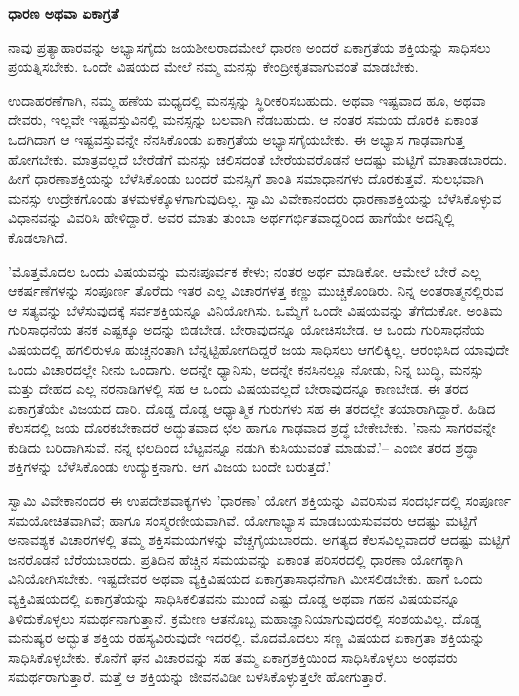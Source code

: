 \textbf{ಧಾರಣ ಅಥವಾ ಏಕಾಗ್ರತೆ}

ನಾವು ಪ್ರತ್ಯಾಹಾರವನ್ನು ಅಭ್ಯಾಸಗೈದು ಜಯಶೀಲರಾದಮೇಲೆ ಧಾರಣ ಅಂದರೆ ಏಕಾಗ್ರತೆಯ ಶಕ್ತಿಯನ್ನು ಸಾಧಿಸಲು ಪ್ರಯತ್ನಿಸಬೇಕು. ಒಂದೇ ವಿಷಯದ ಮೇಲೆ ನಮ್ಮ ಮನಸ್ಸು ಕೇಂದ್ರೀಕೃತವಾಗುವಂತೆ ಮಾಡಬೇಕು.

ಉದಾಹರಣೆಗಾಗಿ, ನಮ್ಮ ಹಣೆಯ ಮಧ್ಯದಲ್ಲಿ ಮನಸ್ಸನ್ನು ಸ್ಥಿರೀಕರಿಸಬಹುದು. ಅಥವಾ ಇಷ್ಟವಾದ ಹೂ, ಅಥವಾ ದೇವರು, ಇಲ್ಲವೇ ಇಷ್ಟವಸ್ತುವಿನಲ್ಲಿ ಮನಸ್ಸನ್ನು ಬಲವಾಗಿ ನೆಡಬಹುದು. ಆ ನಂತರ ಸಮಯ ದೊರಕಿ ಏಕಾಂತ ಒದಗಿದಾಗ ಆ ಇಷ್ಟವಸ್ತುವನ್ನೇ ನೆನಸಿಕೊಂಡು ಏಕಾಗ್ರತೆಯ ಅಭ್ಯಾಸಗೈಯಬೇಕು. ಈ ಅಭ್ಯಾಸ ಗಾಢವಾಗುತ್ತ ಹೋಗಬೇಕು. ಮಾತ್ರವಲ್ಲದೆ ಬೇರೆಡೆಗೆ ಮನಸ್ಸು ಚಲಿಸದಂತೆ ಬೇರೆಯವರೊಡನೆ ಆದಷ್ಟು ಮಟ್ಟಿಗೆ ಮಾತಾಡಬಾರದು. ಹೀಗೆ ಧಾರಣಾಶಕ್ತಿಯನ್ನು ಬೆಳೆಸಿಕೊಂಡು ಬಂದರೆ ಮನಸ್ಸಿಗೆ ಶಾಂತಿ ಸಮಾಧಾನಗಳು ದೊರಕುತ್ತವೆ. ಸುಲಭವಾಗಿ ಮನಸ್ಸು ಉದ್ರೇಕಗೊಂಡು ತಳಮಳಕ್ಕೊಳಗಾಗುವುದಿಲ್ಲ. ಸ್ವಾಮಿ ವಿವೇಕಾನಂದರು ಧಾರಣಾಶಕ್ತಿಯನ್ನು ಬೆಳೆಸಿಕೊಳ್ಳುವ ವಿಧಾನವನ್ನು ವಿವರಿಸಿ ಹೇಳಿದ್ದಾರೆ. ಅವರ ಮಾತು ತುಂಬಾ ಅರ್ಥಗರ್ಭಿತವಾದ್ದರಿಂದ ಹಾಗೆಯೇ ಅದನ್ನಿಲ್ಲಿ ಕೊಡಲಾಗಿದೆ.

'ಮೊತ್ತಮೊದಲ ಒಂದು ವಿಷಯವನ್ನು ಮನಃಪೂರ್ವಕ ಕೇಳು; ನಂತರ ಅರ್ಥ ಮಾಡಿಕೋ. ಆಮೇಲೆ ಬೇರೆ ಎಲ್ಲ ಆಕರ್ಷಣೆಗಳನ್ನು ಸಂಪೂರ್ಣ ತೊರೆದು ಇತರ ಎಲ್ಲ ವಿಚಾರಗಳತ್ತ ಕಣ್ಣು ಮುಚ್ಚಿಕೊಂಡಿರು. ನಿನ್ನ ಅಂತರಾತ್ಮನಲ್ಲಿರುವ ಆ ಸತ್ಯವನ್ನು ಬೆಳೆಸುವುದಕ್ಕೆ ಸರ್ವಶಕ್ತಿಯನ್ನೂ ವಿನಿಯೋಗಿಸು. ಒಮ್ಮೆಗೆ ಒಂದೇ ವಿಷಯವನ್ನು ತೆಗೆದುಕೋ. ಅಂತಿಮ ಗುರಿಸಾಧನೆಯ ತನಕ ಎಷ್ಟಕ್ಕೂ ಅದನ್ನು ಬಿಡಬೇಡ. ಬೇರಾವುದನ್ನೂ ಯೋಚಿಸಬೇಡ. ಆ ಒಂದು ಗುರಿಸಾಧನೆಯ ವಿಷಯದಲ್ಲಿ ಹಗಲಿರುಳೂ ಹುಚ್ಚನಂತಾಗಿ ಬೆನ್ನಟ್ಟಿಹೋಗದಿದ್ದರೆ ಜಯ ಸಾಧಿಸಲು ಆಗಲಿಕ್ಕಿಲ್ಲ. ಆರಂಭಿಸಿದ ಯಾವುದೇ ಒಂದು ವಿಚಾರದಲ್ಲೇ ನೀನು ಒಂದಾಗು. ಅದನ್ನೇ ಧ್ಯಾನಿಸು, ಅದನ್ನೇ ಕನಸಿನಲ್ಲೂ ನೋಡು, ನಿನ್ನ ಬುದ್ಧಿ, ಮನಸ್ಸು ಮತ್ತು ದೇಹದ ಎಲ್ಲ ನರನಾಡಿಗಳಲ್ಲಿ ಸಹ ಆ ಒಂದು ವಿಷಯವಲ್ಲದೆ ಬೇರಾವುದನ್ನೂ ಕಾಣಬೇಡ. ಈ ತರದ ಏಕಾಗ್ರತೆಯೇ ವಿಜಯದ ದಾರಿ. ದೊಡ್ಡ ದೊಡ್ಡ ಆಧ್ಯಾತ್ಮಿಕ ಗುರುಗಳು ಸಹ ಈ ತರದಲ್ಲೇ ತಯಾರಾಗಿದ್ದಾರೆ. ಹಿಡಿದ ಕೆಲಸದಲ್ಲಿ ಜಯ ದೊರಕಬೇಕಾದರೆ ಅದ್ಭುತವಾದ ಛಲ ಹಾಗೂ ಗಾಢವಾದ ಶ್ರದ್ಧೆ ಬೇಕೇಬೇಕು. 'ನಾನು ಸಾಗರವನ್ನೇ ಕುಡಿದು ಬರಿದಾಗಿಸುವೆ. ನನ್ನ ಛಲದಿಂದ ಬೆಟ್ಟವನ್ನೂ ನಡುಗಿ ಕುಸಿಯುವಂತೆ ಮಾಡುವೆ.'– ಎಂಬೀ ತರದ ಶ್ರದ್ಧಾ ಶಕ್ತಿಗಳನ್ನು ಬೆಳೆಸಿಕೊಂಡು ಉದ್ಯುಕ್ತನಾಗು. ಆಗ ವಿಜಯ ಬಂದೇ ಬರುತ್ತದೆ.'

ಸ್ವಾಮಿ ವಿವೇಕಾನಂದರ ಈ ಉಪದೇಶವಾಕ್ಯಗಳು 'ಧಾರಣಾ' ಯೋಗ ಶಕ್ತಿಯನ್ನು ವಿವರಿಸುವ ಸಂದರ್ಭದಲ್ಲಿ ಸಂಪೂರ್ಣ ಸಮಯೋಚಿತವಾಗಿವೆ; ಹಾಗೂ ಸಂಸ್ಮರಣೀಯವಾಗಿವೆ. ಯೋಗಾಭ್ಯಾಸ ಮಾಡಬಯಸುವವರು ಆದಷ್ಟು ಮಟ್ಟಿಗೆ ಅನಾವಶ್ಯಕ ವಿಚಾರಗಳಲ್ಲಿ ತಮ್ಮ ಶಕ್ತಿಸಮಯಗಳನ್ನು ವೆಚ್ಚಗೈಯಬಾರದು. ಅಗತ್ಯದ ಕೆಲಸವಿಲ್ಲವಾದರೆ ಆದಷ್ಟು ಮಟ್ಟಿಗೆ ಜನರೊಡನೆ ಬೆರೆಯಬಾರದು. ಪ್ರತಿದಿನ ಹೆಚ್ಚಿನ ಸಮಯವನ್ನು ಏಕಾಂತ ಪರಿಸರದಲ್ಲಿ ಧಾರಣಾ ಯೋಗಕ್ಕಾಗಿ ವಿನಿಯೋಗಿಸಬೇಕು. ಇಷ್ಟದೇವರ ಅಥವಾ ವ್ಯಕ್ತಿವಿಷಯದ ಏಕಾಗ್ರತಾಸಾಧನೆಗಾಗಿ ಮೀಸಲಿಡಬೇಕು. ಹಾಗೆ ಒಂದು ವ್ಯಕ್ತಿವಿಷಯದಲ್ಲಿ ಏಕಾಗ್ರತೆಯನ್ನು ಸಾಧಿಸಿಕಲಿತವನು ಮುಂದೆ ಎಷ್ಟು ದೊಡ್ಡ ಅಥವಾ ಗಹನ ವಿಷಯವನ್ನೂ ತಿಳಿದುಕೊಳ್ಳಲು ಸಮರ್ಥನಾಗುತ್ತಾನೆ. ಕ್ರಮೇಣ ಆತನೊಬ್ಬ ಮಹಾಜ್ಞಾನಿಯಾಗುವುದರಲ್ಲಿ ಸಂಶಯವಿಲ್ಲ. ದೊಡ್ಡ ಮನುಷ್ಯರ ಅದ್ಭುತ ಶಕ್ತಿಯ ರಹಸ್ಯವಿರುವುದೇ ಇದರಲ್ಲಿ. ಮೊದಮೊದಲು ಸಣ್ಣ ವಿಷಯದ ಏಕಾಗ್ರತಾ ಶಕ್ತಿಯನ್ನು ಸಾಧಿಸಿಕೊಳ್ಳಬೇಕು. ಕೊನೆಗೆ ಘನ ವಿಚಾರವನ್ನು ಸಹ ತಮ್ಮ ಏಕಾಗ್ರಶಕ್ತಿಯಿಂದ ಸಾಧಿಸಿಕೊಳ್ಳಲು ಅಂಥವರು ಸಮರ್ಥರಾಗುತ್ತಾರೆ. ಮತ್ತೆ ಆ ಶಕ್ತಿಯನ್ನು ಜೀವನವಿಡೀ ಬಳಸಿಕೊಳ್ಳುತ್ತಲೇ ಹೋಗುತ್ತಾರೆ.

